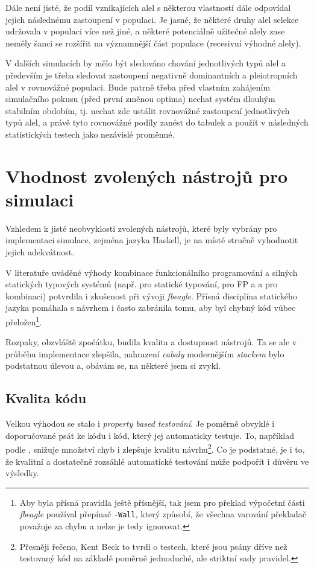 Dále není jisté, že podíl vznikajících alel s některou vlastností dále odpovídal jejich následnému zastoupení v
populaci. Je jasné, že některé druhy alel selekce udržovala v populaci více než jiné, a některé potenciálně užitečné
alely zase neměly šanci se rozšířit na významnější část populace (recesivní výhodné alely).

V dalších simulacích by mělo být sledováno chování jednotlivých typů alel a především je třeba sledovat zastoupení
negativně dominantních a pleiotropních alel v rovnovážné populaci.
Bude patrně třeba před vlastním zahájením simulačního pokusu (před první změnou  optima) nechat systém 
dlouhým stabilním obdobím, tj. nechat zde ustálit rovnovážné zastoupení jednotlivých typů alel,
a právě tyto rovnovážné podíly zanést do tabulek a použít v následných statistických testech jako nezávislé proměnné.

\section{Vhodnost zvolených nástrojů pro simulaci}

Vzhledem k jisté neobvyklosti zvolených nástrojů, které byly vybrány pro implementaci simulace, zejména jazyka Haskell,
je na místě stručně vyhodnotit jejich adekvátnost.

V literatuře uváděné výhody kombinace funkcionálního programování a silných statických typových systémů (např. \citet{meijer2004static} pro
statické typování, \citet{hughes1989functional} pro FP a \citet{Chiusano2016} a \citet{ray2014large} pro kombinaci)
potvrdila i zkušenost při vývoji
\textit{fbeagle}. Přísná disciplína statického jazyka pomáhala s návrhem i často zabránila tomu, aby byl chybný kód vůbec přeložen\footnote{
Aby byla přísná pravidla ještě přísnější, tak jsem pro překlad výpočetní části \textit{fbeagle} používal přepínač \texttt{-Wall}, který způsobí,
že všechna varování překladač považuje za chybu a nelze je tedy ignorovat.
}.

Rozpaky, obzvláště zpočátku, budila kvalita a dostupnost nástrojů. Ta se ale v průběhu implementace zlepšila, nahrazení \textit{cabaly} modernějším
\textit{stackem} bylo podstatnou úlevou a, obávám se, na některé  jsem si zvykl.

\subsection{Kvalita kódu}

Velkou výhodou se stalo i \textit{property based testování}. Je poměrně obvyklé i doporučované \citep{williams2009effectiveness} psát ke kódu i kód, který jej
automaticky testuje. To, například podle \citet{beck2003test}, snižuje množství chyb i zlepšuje kvalitu návrhu\footnote{
Přesněji řečeno, Kent Beck to tvrdí o testech, které jsou psány dříve než testovaný kód na základě poměrně jednoduché,
ale striktní sady pravidel.}.
Co je podstatné, je i to, že kvalitní a dostatečně rozsáhlé automatické testování může podpořit i důvěru ve výsledky.


